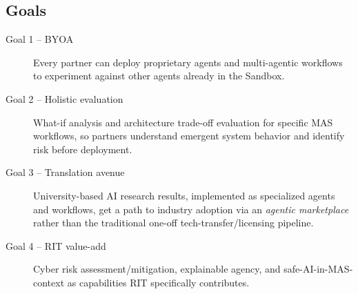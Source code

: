 \documentclass[10pt,conference]{IEEEtran}
\begin{document}
\subsection{Goals}
\label{sec:goals}
\begin{description}
  \item[Goal 1 -- BYOA] Every partner can deploy proprietary agents and
  multi-agentic workflows to experiment against other agents already in
  the Sandbox.
  \item[Goal 2 -- Holistic evaluation] What-if analysis and architecture
  trade-off evaluation for specific MAS workflows, so partners understand
  emergent system behavior and identify risk before deployment.
  \item[Goal 3 -- Translation avenue] University-based AI research results,
  implemented as specialized agents and workflows, get a path to industry
  adoption via an \emph{agentic marketplace} rather than the traditional
  one-off tech-transfer/licensing pipeline.
  \item[Goal 4 -- RIT value-add] Cyber risk assessment/mitigation,
  explainable agency, and safe-AI-in-MAS-context as capabilities RIT
  specifically contributes.
\end{description}
\end{document}
